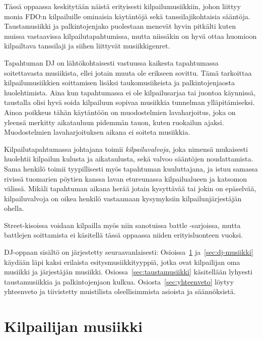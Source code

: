 \documentclass[12pt, a4paper, oneside]{article}
\begin{document}
Tässä oppaassa keskitytään näistä erityisesti kilpailumusiikkiin,
johon liittyy monia FDO:n kilpailuille ominaisia käytäntöjä sekä tanssilajikohtaisia sääntöja.
Taustamusiikki ja palkintojenjako puolestaan menevät hyvin pitkälti kuten muissa vastaavissa kilpailutapahtumissa,
mutta niissäkin on hyvä ottaa huomioon kilpailtava tanssilaji ja siihen liittyvät musiikkigenret.

Tapahtuman DJ on lähtökohtaisesti vastuussa kaikesta tapahtumassa soitettavasta musiikista,
ellei jotain muuta ole erikseen sovittu.
Tämä tarkoittaa kilpailumusiikkien soittamisen lisäksi taukomusiikeista ja palkintojenjaosta huolehtimista.
Aina kun tapahtumassa ei ole kilpailusarjaa tai juontoa käynnissä,
taustalla olisi hyvä soida kilpailuun sopivaa musiikkia tunnelman ylläpitämiseksi.
Ainoa poikkeus tähän käytäntöön on muodostelmien lavaharjoitus,
joka on yleensä merkitty aikatauluun pidemmän tauon,
kuten ruokailun ajaksi.
Muodostelmien lavaharjoituksen aikana ei soiteta musiikkia.

Kilpailutapahtumassa johtajana toimii \textit{kilpailuvalvoja},
joka nimensä mukaisesti huolehtii kilpailun kulusta ja aikataulusta,
sekä valvoo sääntöjen noudattamista.
Sama henkilö toimii tyypillisesti myös tapahtuman kuuluttajana,
ja istuu samassa rivissä tuomarien pöytien kanssa lavan etureunassa kilpailualueen ja katsomon välissä.
Mikäli tapahtuman aikana herää jotain kysyttävää tai jokin on epäselvää,
kilpailuvalvoja on oikea henkilö vastaamaan kysymyksiin kilpailunjärjestäjän ohella.

Street-kisoissa voidaan kilpailla myös niin sanotuissa battle -sarjoissa,
mutta battlejen soittamista ei käsitellä tässä oppaassa niiden erityisluonteen vuoksi.

DJ-oppaan sisältö on järjestetty seuraavanlaisesti:
Osioissa~\ref{sec:kilpailijan-musiikki} ja~\ref{sec:dj-musiikki} käydään läpi kaksi erilaista esitysmusiikkityyppiä,
jotka ovat kilpailijan oma musiikki ja järjestäjän musiikki.
Osiossa~\ref{sec:taustamusiikki} käsitellään lyhyesti taustamusiikkia ja palkintojenjaon kulkua.
Osiosta~\ref{sec:yhteenveto} löytyy yhteenveto ja tiivistetty muistilista oleellisimmista asioista ja säännöksistä.

\section{Kilpailijan musiikki} \label{sec:kilpailijan-musiikki}
\end{document}
